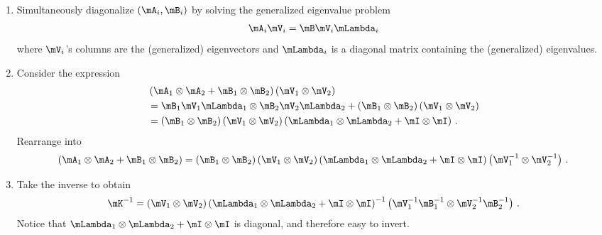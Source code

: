 \begin{enumerate}
\item Simultaneously diagonalize $(\mA_i, \mB_i)$ by solving the generalized eigenvalue problem
  \begin{align*}
    \mA_i \mV_i = \mB \mV_i \mLambda_i
  \end{align*}
  where $\mV_i$'s columns are the (generalized) eigenvectors and $\mLambda_i$ is a diagonal matrix containing the (generalized) eigenvalues.

\item Consider the expression
  \begin{align*}
    &\left(
      \mA_1 \otimes \mA_2
      +
      \mB_1 \otimes \mB_2
      \right)
      \left(
      \mV_1 \otimes \mV_2
      \right)
    \\
    &=
      \mB_1 \mV_1 \mLambda_1 \otimes \mB_2 \mV_2 \mLambda_2
      +
      \left( \mB_1 \otimes \mB_2 \right)
      \left( \mV_1 \otimes \mV_2 \right)
    \\
    &=
      \left( \mB_1 \otimes \mB_2 \right)
      \left( \mV_1 \otimes \mV_2 \right)
      \left(
      \mLambda_1 \otimes \mLambda_2 + \mI \otimes \mI
      \right)\,.
  \end{align*}
  Rearrange into
  \begin{align*}
    \left(
    \mA_1 \otimes \mA_2
    +
    \mB_1 \otimes \mB_2
    \right)
    =
    \left( \mB_1 \otimes \mB_2 \right)
    \left( \mV_1 \otimes \mV_2 \right)
    \left(
    \mLambda_1 \otimes \mLambda_2 + \mI \otimes \mI
    \right)
    \left( \mV_1^{-1} \otimes \mV_2^{-1} \right)
    \,.
  \end{align*}

  \item Take the inverse to obtain
    \begin{align*}
      \mK^{-1}
      =
      \left( \mV_1 \otimes \mV_2 \right)
      \left(
      \mLambda_1 \otimes \mLambda_2 + \mI \otimes \mI
      \right)^{-1}
      \left( \mV_1^{-1}\mB_1^{-1} \otimes \mV_2^{-1}\mB_2^{-1} \right)
      \,.
    \end{align*}
    Notice that $\mLambda_1 \otimes \mLambda_2 + \mI \otimes \mI$ is diagonal, and therefore easy to invert.
\end{enumerate}

